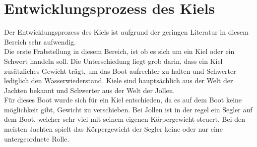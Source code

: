 \section{Entwicklungsprozess des Kiels}
Der Entwicklungsprozess des Kiels ist aufgrund der geringen Literatur in diesem Bereich sehr aufwendig. \\ Die erste Frabstellung in diesem Bereich, ist ob es sich um ein Kiel oder ein Schwert handeln soll. Die Unterschiedung liegt grob darin, dass ein Kiel zusätzliches Gewicht trägt, um das Boot aufrechter zu halten und Schwerter lediglich den Wasserwiederstand. Kiele sind hauptsächlich aus der Welt der Jachten bekannt und Schwerter aus der Welt der Jollen. \\
Für dieses Boot wurde sich für ein Kiel entschieden, da es auf dem Boot keine möglichkeit gibt, Gewicht zu verschieben. Bei Jollen ist in der regel ein Segler auf dem Boot, welcher sehr viel mit seinem eigenen Körpergewicht steuert. Bei den meisten Jachten spielt das Körpergewicht der Segler keine oder nur eine untergeordnete Rolle.